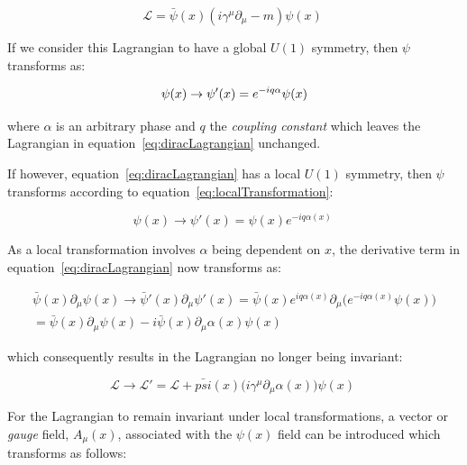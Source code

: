 \begin{equation}
\mathcal{L} = \bar{\psi}(x) (i {\gamma}^{\mu} \partial_{\mu} - m) \psi(x) \;
\label{eq:diracLagrangian}
\end{equation}

If we consider this Lagrangian to have a global $U(1)$ symmetry, then $\psi$ transforms as:

\begin{equation}
\psi(x) \rightarrow \psi'(x) = e^{-i q \alpha} \psi(x) \\
\label{eq:globalTransformation}
\end{equation}

where $\alpha$ is an arbitrary phase and $q$ the \emph{coupling constant} which leaves the Lagrangian in equation~\ref{eq:diracLagrangian} unchanged.

If however, equation~\ref{eq:diracLagrangian} has a local $U(1)$ symmetry, then $\psi$ transforms according to equation~\ref{eq:localTransformation}:

\begin{equation}
\psi(x) \rightarrow \psi'(x) = \psi(x) e^{-i q \alpha (x) } \;
\label{eq:localTransformation}
\end{equation}

As a local transformation involves $\alpha$ being dependent on $x$, the derivative term in equation~\ref{eq:diracLagrangian} now transforms as:

\begin{equation}
\begin{aligned}
\bar{\psi}(x) \partial_{\mu} \psi(x) \rightarrow \bar{\psi}'(x) \partial_{\mu} \psi'(x) = \bar{\psi} (x) e^{i q \alpha (x) } \partial_{\mu} \big(e^{-i q \alpha (x) } \psi(x) \big)\\
= \bar{\psi} (x) \partial_{\mu} \psi(x) - i \bar{\psi} (x) \partial_{\mu} \alpha (x) \psi(x) \;
\end{aligned}
\label{eq:derivativeLocalTransformation}
\end{equation}

which consequently results in the Lagrangian no longer being invariant:

\begin{equation}
\mathcal{L} \rightarrow \mathcal{L}' = \mathcal{L} + \bar{psi}(x) \big( i {\gamma}^{\mu} \partial_{\mu} \alpha(x) \big) \psi(x) \;
\label{eq:localLagrangian}
\end{equation}

For the Lagrangian to remain invariant under local transformations, a vector or \emph{gauge} field, $A_{\mu}(x)$, associated with the $\psi(x)$ field can be introduced which transforms as follows:

